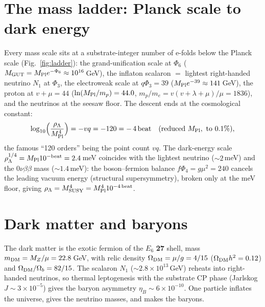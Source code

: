 \documentclass[11pt]{article}
\newcommand{\Pl}{M_{\rm Pl}}
\begin{document}
\section{The mass ladder: Planck scale to dark energy}
Every mass scale sits at a substrate-integer number of e-folds below the Planck scale
(Fig.~\ref{fig:ladder}): the grand-unification scale at $\Phi_6$ ($M_{\rm GUT}=\Pl e^{-\Phi_6}
\approx10^{16}$\,GeV), the inflaton scalaron $=$ lightest right-handed neutrino $N_1$ at
$\Phi_3$, the electroweak scale at $q\Phi_3=39$ ($\Pl e^{-39}\approx141$\,GeV), the proton at
$v+\mu=44$ ($\ln(\Pl/m_p)=44.0$, $m_p/m_e=v(v+\lambda+\mu)/\mu=1836$), and the neutrinos at the
seesaw floor. The descent ends at the cosmological constant:
\[
\log_{10}\!\Big(\frac{\rho_\Lambda}{\Pl^4}\Big)=-vq=-120=-\,4\,\mathrm{beat}
\quad(\text{reduced }\Pl,\ \text{to }0.1\%),
\]
the famous ``120 orders'' being the point count $vq$. The dark-energy scale
$\rho_\Lambda^{1/4}=\Pl10^{-\mathrm{beat}}=2.4$\,meV coincides with the lightest neutrino
($\sim2$\,meV) and the $0\nu\beta\beta$ mass ($\sim1.4$\,meV): the boson--fermion balance
$f\Phi_4=g\mu^2=240$ cancels the leading vacuum energy (structural supersymmetry), broken only
at the meV floor, giving $\rho_\Lambda=M_{\rm SUSY}^4=\Pl^4 10^{-4\,\mathrm{beat}}$.



\section{Dark matter and baryons}
The dark matter is the exotic fermion of the $E_6$ \textbf{27} shell, mass $m_{\rm DM}=M_Z/\mu
=22.8$\,GeV, with relic density $\Omega_{\rm DM}=\mu/g=4/15$ ($\Omega_{\rm DM}h^2=0.12$) and
$\Omega_{\rm DM}/\Omega_b=82/15$. The scalaron $N_1$ ($\sim2.8\times10^{13}$\,GeV) reheats into
right-handed neutrinos, so thermal leptogenesis with the substrate CP phase (Jarlskog
$J\sim3\times10^{-5}$) gives the baryon asymmetry $\eta_B\sim6\times10^{-10}$. One particle
inflates the universe, gives the neutrino masses, and makes the baryons.
\end{document}
